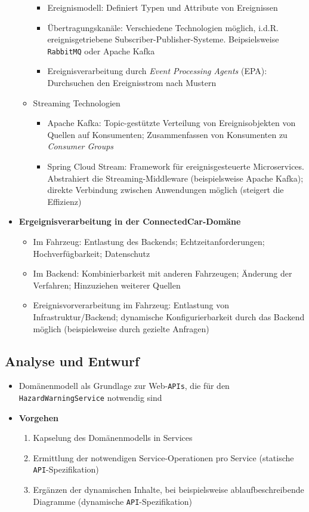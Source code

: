 \begin{itemize}
\begin{itemize}
		\begin{itemize}
			\item Ereignismodell: Definiert Typen und Attribute von Ereignissen
			\item Übertragungskanäle: Verschiedene Technologien möglich, i.d.R. ereignisgetriebene Subscriber-Publisher-Systeme. Beipsielsweise \texttt{RabbitMQ} oder Apache Kafka
			\item Ereignisverarbeitung durch \textit{Event Processing Agents} (EPA): Durchsuchen den Ereignisstrom nach Mustern
		\end{itemize}
		\item Streaming Technologien
		\begin{itemize}
			\item Apache Kafka: Topic-gestützte Verteilung von Ereignisobjekten von Quellen auf Konsumenten; Zusammenfassen von Konsumenten zu \textit{Consumer Groups}
			\item Spring Cloud Stream: Framework für ereignisgesteuerte Microservices. Abstrahiert die Streaming-Middleware (beispielsweise Apache Kafka); direkte Verbindung zwischen Anwendungen möglich (steigert die Effizienz)
		\end{itemize}
	\end{itemize}
	\item \textbf{Ergeignisverarbeitung in der ConnectedCar-Domäne}
	\begin{itemize}
		\item Im Fahrzeug: Entlastung des Backends; Echtzeitanforderungen; Hochverfügbarkeit; Datenschutz
		\item Im Backend: Kombinierbarkeit mit anderen Fahrzeugen; Änderung der Verfahren; Hinzuziehen weiterer Quellen
		\item Ereignisvorverarbeitung im Fahrzeug: Entlastung von Infrastruktur/Backend; dynamische Konfigurierbarkeit durch das Backend möglich (beispielsweise durch gezielte Anfragen)
	\end{itemize}
\end{itemize}


\subsection{Analyse und Entwurf}
\begin{itemize}
	\item Domänenmodell als Grundlage zur Web-\texttt{APIs}, die für den \texttt{HazardWarningService} notwendig sind
	\item \textbf{Vorgehen}
	\begin{enumerate}
		\item Kapselung des Domänenmodells in Services
		\item Ermittlung der notwendigen Service-Operationen pro Service (statische \texttt{API}-Spezifikation)
		\item Ergänzen der dynamischen Inhalte, bei beispielsweise ablaufbeschreibende Diagramme (dynamische \texttt{API}-Spezifikation)
	\end{enumerate}
\end{itemize}



